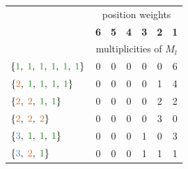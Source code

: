 \documentclass[12pt]{article}
\begin{document}
\begin{table}
  \centering
  \begin{tabular}{|l|ccccc|c|}
  \hline
  \cellcolor{bg} & \multicolumn{6}{c|}{\cellcolor{bgw}position weights}       \\
  \hhline{|>{\arrayrulecolor{bg}}->{\arrayrulecolor{black}}|------}
  \multicolumn{1}{|c|}{\cellcolor{bg}multiset $M_l$} & 
  \multicolumn{1}{c|}{\cellcolor{bgw}\textbf{6}} & 
  \multicolumn{1}{c|}{\cellcolor{bgw}\textbf{5}} & 
  \multicolumn{1}{c|}{\cellcolor{bgw}\textbf{4}} & 
  \multicolumn{1}{c|}{\cellcolor{bgw}\textbf{3}} & 
  \multicolumn{1}{c|}{\cellcolor{bgw}\textbf{2}} & 
  \cellcolor{bgw}\textbf{1}                                                   \\
  \hhline{|>{\arrayrulecolor{bg}}|-|>{\arrayrulecolor{black}}|------}  
  \cellcolor{bg} & \multicolumn{6}{c|}{\cellcolor{bg} multiplicities of $M_l$}\\
  \hline
  $\{{\color{c1}1}, \; {\color{c1}1}, \; {\color{c1}1}, \; {\color{c1}1}, \; 
     {\color{c1}1}, \; {\color{c1}1}\}$ & 
  \color{c6}0 & \color{c5}0 & \color{c4}0 & \color{c3}0 & \color{c2}0 & 
  \color{c1} 6                                                                \\
  $\{{\color{c2}2}, \; {\color{c1}1}, \; {\color{c1}1}, \; {\color{c1}1}, \;  
     {\color{c1}1}\}$ & 
  \color{c6}0 & \color{c5}0 & \color{c4}0 & \color{c3}0 & \color{c2}1 & 
  \color{c1}4                                                                 \\
  $\{{\color{c2}2}, \; {\color{c2}2}, \; {\color{c1}1}, \; {\color{c1}1}\}$ &
  \color{c6}0 & \color{c5}0 & \color{c4}0 & \color{c3}0 & \color{c2}2 & 
  \color{c1}2                                                                 \\
  $\{{\color{c2}2}, \; {\color{c2}2}, \; {\color{c2}2}\}$ &
  \color{c6}0 & \color{c5}0 & \color{c4}0 & \color{c3}0 & \color{c2}3 & 
  \color{c1}0                                                                 \\
  $\{{\color{c3}3}, \; {\color{c1}1}, \; {\color{c1}1}, \; {\color{c1}1}\}$ &
  \color{c6}0 & \color{c5}0 & \color{c4}0 & \color{c3}1 & \color{c2}0 & 
  \color{c1}3                                                                 \\
  $\{{\color{c3}3}, \; {\color{c2}2}, \; {\color{c1}1}\}$ & 
  \color{c6}0 & \color{c5}0 & \color{c4}0 & \color{c3}1 & \color{c2}1 & 
  \color{c1}1                                                                 \\

\end{tabular}
\end{table}
\end{document}

